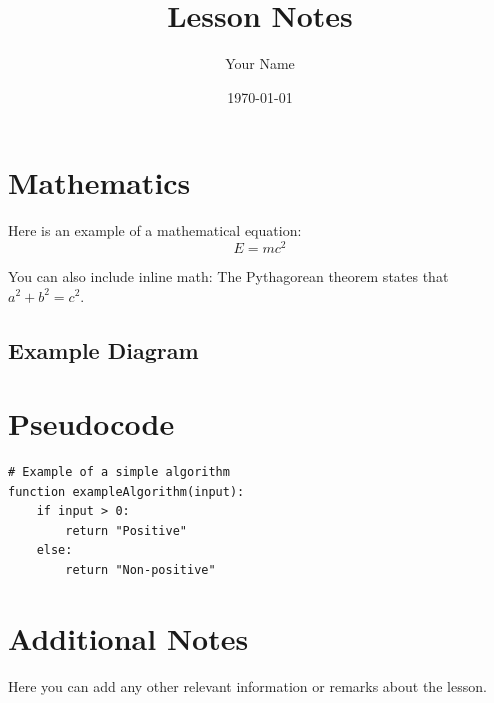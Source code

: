 \documentclass[a4paper, 12pt]{article}
\title{Lesson Notes}
\author{Your Name}
\date{\today}
\begin{document}
\maketitle

\section{Mathematics}
Here is an example of a mathematical equation:
\[
    E = mc^2
\]

You can also include inline math:
The Pythagorean theorem states that \( a^2 + b^2 = c^2 \).

\subsection{Example Diagram}
\begin{center}
\end{center}

\section{Pseudocode}
\begin{lstlisting}
# Example of a simple algorithm
function exampleAlgorithm(input):
    if input > 0:
        return "Positive"
    else:
        return "Non-positive"
\end{lstlisting}

\section{Additional Notes}
Here you can add any other relevant information or remarks about the lesson.
\end{document}
